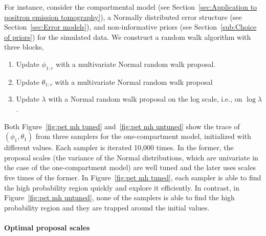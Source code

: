For instance, consider the \pet compartmental model (see
Section~\ref{sec:Application to positron emission tomography}), a Normally
distributed error structure (see Section~\ref{sec:Error models}), and
non-informative priors (see Section~\ref{sub:Choice of priors}) for the
simulated data. We construct a random walk algorithm with three blocks,
\begin{enumerate}
  \item Update $\phi_{1:r}$ with a multivariate Normal random walk proposal.
  \item Update $\theta_{1:r}$ with a multivariate Normal random walk proposal
  \item Update $\lambda$ with a Normal random walk proposal on the log scale,
    i.e., on $\log\lambda$.
\end{enumerate}
Both Figure~\ref{fig:pet mh tuned} and~\ref{fig:pet mh untuned} show the
trace of $(\phi_1, \theta_1)$ from three samplers for the one-compartment
model, initialized with different values. Each sampler is iterated 10,000
times. In the former, the proposal scales (the variance of the Normal
distributions, which are univariate in the case of the one-compartment model)
are well tuned and the later uses scales five times of the former. In
Figure~\ref{fig:pet mh tuned}, each sampler is able to find the high
probability region quickly and explore it efficiently. In contrast, in
Figure~\ref{fig:pet mh untuned}, none of the samplers is able to find the
high probability region and they are trapped around the initial values.




\paragraph{Optimal proposal scales}

